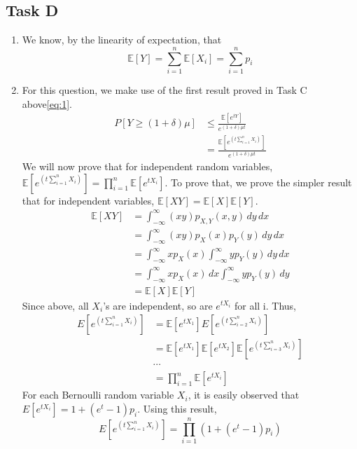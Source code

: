 \subsection{Task D}
\begin{enumerate}
    \item We know, by the linearity of expectation, that \[
        \mathbb{E}[Y]=\sum_{i=1}^{n}\mathbb{E}[X_i]=\sum_{i=1}^{n}p_i
    \]
    \item For this question, we make use of the first result proved in Task C above\ref{eq:1}. 
    \begin{align*}       
        \label{Hello}
        P[Y\ge (1+\delta)\mu]&\le \frac{\mathbb{E}[e^{tY}]}{e^{(1+\delta)\mu t}}\\
        &=\frac{\mathbb{E}[e^{\left(t \sum_{i=1}^n X_i\right)}]}{e^{(1+\delta)\mu t}}
    \end{align*}
    We will now prove that for independent random variables, $\mathbb{E}[e^{\left(t\sum_{i=1}^n X_i\right)}]=\prod_{i=1}^n \mathbb{E}[e^{tX_i}]$. To prove that, we prove the simpler result that for independent variables, $\mathbb{E}[XY]=\mathbb{E}[X]\mathbb{E}[Y]$.
    \begin{align*}
        \mathbb{E}[XY]&=\int_{-\infty}^{\infty}(xy)p_{X,Y}(x,y) \, dy \, dx\\
        & = \int_{-\infty}^{\infty}(xy)p_X(x)p_Y(y) \, dy \, dx\\
        &= \int_{-\infty}^{\infty}x p_X(x) \int_{-\infty}^{\infty}yp_Y(y) \, dy \, dx\\
        &= \int_{-\infty}^{\infty}x p_X(x) \, dx \int_{-\infty}^{\infty}y p_Y(y) \, dy\\
        &= \mathbb{E}[X]\mathbb{E}[Y]
    \end{align*}
    Since above, all $X_i$'s are independent, so are $e^{tX_i}$ for all i. Thus,
    \begin{align*}
        E[e^{\left(t \sum_{i=1}^n X_i\right)}]&=\mathbb{E}[e^{tX_1}]E[e^{\left(t \sum_{i=2}^n X_i\right)}]\\
        &=\mathbb{E}[e^{tX_1}]\mathbb{E}[e^{tX_2}]\mathbb{E}[e^{\left(t \sum_{i=3}^n X_i\right)}]\\
        &\cdots\\
        &=\prod_{i=1}^n \mathbb{E}[e^{tX_i}]
    \end{align*}
    For each Bernoulli random variable $X_i$, it is easily observed that $E[e^{tX_i}]=1+(e^t-1)p_i$. Using this result,
    \[
        E[e^{\left(t \sum_{i=1}^n X_i\right)}]=\prod_{i=1}^n (1+(e^t-1)p_i)
    \]

\end{enumerate}
